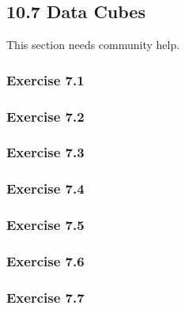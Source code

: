 \documentclass[../../main.tex]{subfiles}
\begin{document}
\subsection{10.7 Data Cubes}

This section needs community help.

\subsubsection*{Exercise 7.1}

\subsubsection*{Exercise 7.2}

\subsubsection*{Exercise 7.3}

\subsubsection*{Exercise 7.4}

\subsubsection*{Exercise 7.5}

\subsubsection*{Exercise 7.6}

\subsubsection*{Exercise 7.7}
\end{document}
